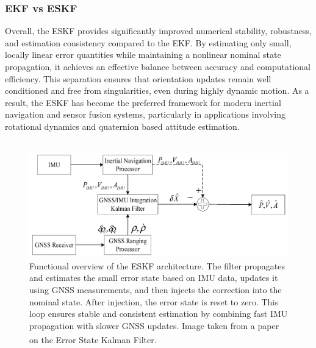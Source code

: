 \subsubsection{EKF vs ESKF}
Overall, the ESKF provides significantly improved numerical stability, robustness, and estimation consistency compared to the EKF. By estimating only small, locally linear error quantities while maintaining a nonlinear nominal state propagation, it achieves an effective balance between accuracy and computational efficiency. This separation ensures that orientation updates remain well conditioned and free from singularities, even during highly dynamic motion. As a result, the ESKF has become the preferred framework for modern inertial navigation and sensor fusion systems, particularly in applications involving rotational dynamics and quaternion based attitude estimation.
\\ \\
\begin{figure}[H]
    \centering
    \includegraphics[width=1.0\linewidth]{Pictures/State_Estimation/Error_State_Kalman_Filter/Error_State_Kalman_Filter_Illustrated.png}
    \caption{Functional overview of the ESKF architecture. The filter propagates and estimates the small error state based on IMU data, updates it using GNSS measurements, and then injects the correction into the nominal state. After injection, the error state is reset to zero. This loop ensures stable and consistent estimation by combining fast IMU propagation with slower GNSS updates. Image taken from a paper on the Error State Kalman Filter.\textsuperscript{\cite{error_state_kalman_filter}}}
    \label{fig:state-estimation-error-state-kalman-filter}
\end{figure}

